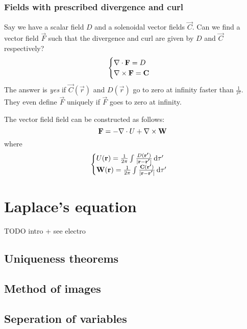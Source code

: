 \subsubsection{Fields with prescribed divergence and curl}
Say we have a scalar field $D$ and a solenoidal vector fields $\vec{C}$. Can we find a vector field $\vec{F}$ such that the divergence and curl are given by $D$ and $\vec{C}$ respectively?
\[ \begin{cases}
\nabla\cdot \bm{\mathrm{F}} = D \\ \mathop{}\! \nabla\times \bm{\mathrm{F}} = \bm{\mathrm{C}}
\end{cases} \]
The answer is \textit{yes} if $\vec{C}(\vec{r})$ and $D(\vec{r})$ go to zero at infinity faster than $\frac{1}{r^2}$. They even define $\vec{F}$ uniquely if $\vec{F}$ goes to zero at infinity.

The vector field field can be constructed as follows:
\[ \bm{\mathrm{F}} = -\nabla\cdot U + \mathop{}\! \nabla\times \bm{\mathrm{W}} \]
where
\[ \begin{cases}
U(\bm{\mathrm{r}}) = \frac{1}{2\pi}\int \frac{D(\bm{\mathrm{r'}})}{|\bm{\mathrm{r}} - \bm{\mathrm{r'}}|}\operatorname{d \!}{\tau'} \\
\bm{\mathrm{W}}(\bm{\mathrm{r}}) = \frac{1}{2\pi}\int \frac{\bm{\mathrm{C}}(\bm{\mathrm{r'}})}{|\bm{\mathrm{r}} - \bm{\mathrm{r'}}|}\operatorname{d \!}{\tau'}
\end{cases} \]

\section{Laplace's equation}
TODO intro + see electro
\subsection{Uniqueness theorems}
\subsection{Method of images}
\subsection{Seperation of variables}
